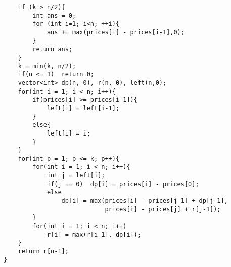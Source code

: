 \begin{description}
\begin{lstlisting}
	if (k > n/2){ 
		int ans = 0;
		for (int i=1; i<n; ++i){
			ans += max(prices[i] - prices[i-1],0);
		}
		return ans;
	}
	k = min(k, n/2);
	if(n <= 1)	return 0;
	vector<int> dp(n, 0), r(n, 0), left(n,0);
	for(int i = 1; i < n; i++){
		if(prices[i] >= prices[i-1]){
			left[i] = left[i-1];
		}
		else{
			left[i] = i;
		}
	}
	for(int p = 1; p <= k; p++){
		for(int i = 1; i < n; i++){
			int j = left[i];
			if(j == 0)	dp[i] = prices[i] - prices[0];
			else
				dp[i] = max(prices[i] - prices[j-1] + dp[j-1],
							prices[i] - prices[j] + r[j-1]);
		}
		for(int i = 1; i < n; i++)
			r[i] = max(r[i-1], dp[i]);
	}
	return r[n-1];
}
    \end{lstlisting}
\end{description}

